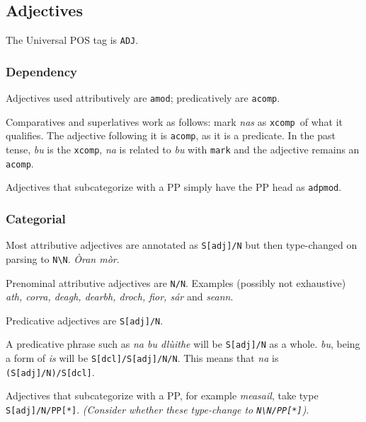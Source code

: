 \documentclass[a4paper]{article}
\begin{document}
\subsection{Adjectives\label{subsect:adjectives}}
\newcommand{\ADJ}{\texttt{ADJ}}
\newcommand{\acomp}{\texttt{acomp}}
\newcommand{\xcomp}{\texttt{xcomp}}
\newcommand{\amod}{\texttt{amod}}
\newcommand{\NbN}{\texttt{N\textbackslash N}}
\newcommand{\SsS}{\texttt{S/S}}
\newcommand{\SbNsSbN}{\texttt{S\textbackslash N/S\textbackslash N}}

The Universal POS tag is \ADJ.

\subsubsection*{Dependency}

 Adjectives used attributively are \amod; predicatively are \acomp.

 Comparatives and superlatives work as follows: mark \textit{nas} as \xcomp\ of what it qualifies.
The adjective following it is \texttt{acomp}, as it is a predicate.
In the past tense, \textit{bu} is the \xcomp, \textit{na} is related to \textit{bu} with \texttt{mark} and the adjective remains an \texttt{acomp}.

 Adjectives that subcategorize with a PP simply have the PP head as \texttt{adpmod}.

\subsubsection*{Categorial}

 Most attributive adjectives are annotated as \texttt{S[adj]/N} but then type-changed on parsing to \texttt{N\textbackslash N}.
\textit{\`Oran m\`or}.

 Prenominal attributive adjectives are \texttt{N/N}.
Examples (possibly not exhaustive) \textit{ath, corra, deagh, dearbh, droch, fior, s\'ar} and \textit{seann}.

 Predicative adjectives are \texttt{S[adj]/N}.

 A predicative phrase such as \textit{na bu dl\`uithe} will be \texttt{S[adj]/N} as a whole.
\textit{bu}, being a form of \textit{is} will be \texttt{S[dcl]/S[adj]/N/N}. This means that \textit{na} is \texttt{(S[adj]/N)/S[dcl]}.

 Adjectives that subcategorize with a PP, for example \textit{measail}, take type \texttt{S[adj]/N/PP[*]}.
\textit{(Consider whether these type-change to \texttt{N\textbackslash N/PP[*]})}.
\end{document}
